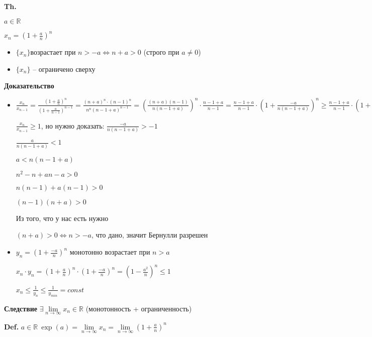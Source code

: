 \documentclass[14pt, letter paper]{article}
\begin{document}
\textbf{Th.}

$a \in \mathds{R}$

$x_n = (1 + \frac{a}{n})^n$

\begin{itemize}
    \item $\{x_n\}$возрастает при  $n > -a \Leftrightarrow n + a > 0$ (строго при $a \neq 0$)
    \item $\{x_n\}$ -- ограничено сверху
\end{itemize}

\begin{center}
    \textbf{Доказательство}
\end{center}

\begin{itemize}
    \item[Возрастание.] $\frac{x_n}{x_{n-1}} = \frac{(1 + \frac{a}{n})^n}{(1 + \frac{a}{n-1})^{n-1}} = \frac{(n + a)^n \cdot (n - 1)^n}{n^n(n - 1 + a)^{n-1}} = (\frac{(n+a)(n-1)}{n(n-1+a)})^n \cdot \frac{n-1+a}{n-1} = \frac{n-1+a}{n-1} \cdot (1 + \frac{-a}{n(n-1+a)})^n \geq \frac{n-1+a}{n-1} \cdot (1 + \frac{-a}{n(n+1-a)}) = \frac{n-1+a}{n-1} \cdot \frac{n-1+a-a}{n-1+a} = 1$

    $\frac{x_n}{x_{n-1}} \geq 1$, но нужно доказать: $\frac{-a}{n(n-1+a)} > -1$

    $\frac{a}{n(n-1+a)} < 1$

    $a < n(n-1+a)$

    $n^2 - n + an - a > 0$

    $n(n-1) + a(n-1) > 0$

    $(n-1)(n+a) > 0$

    Из того, что у нас есть нужно 

    $(n+a) > 0 \Leftrightarrow n > -a$, что дано, значит Бернулли разрешен

    \item[Ограниченность.] $y_n = (1 + \frac{-a}{n})^n$ монотонно возрастает при $n > a$

    $x_n \cdot y_n = (1 + \frac{a}{n})^n \cdot (1 + \frac{-a}{n})^n = (1 - \frac{a^2}{n})^n \leq 1$

    $x_n \leq \frac{1}{y_n} \leq \frac{1}{y_{min}} = const$
\end{itemize}

\textbf{Следствие} $\exists \lim\limits_{n \rightarrow \infty}{x_n} \in \mathds{R}$ (монотонность + ограниченность)

\textbf{Def.} $a \in \mathds{R}\ \exp(a) = \lim\limits_{n \rightarrow \infty}{x_n} = \lim\limits_{n \rightarrow \infty}{(1 + \frac{a}{n})^n}$
\end{document}
